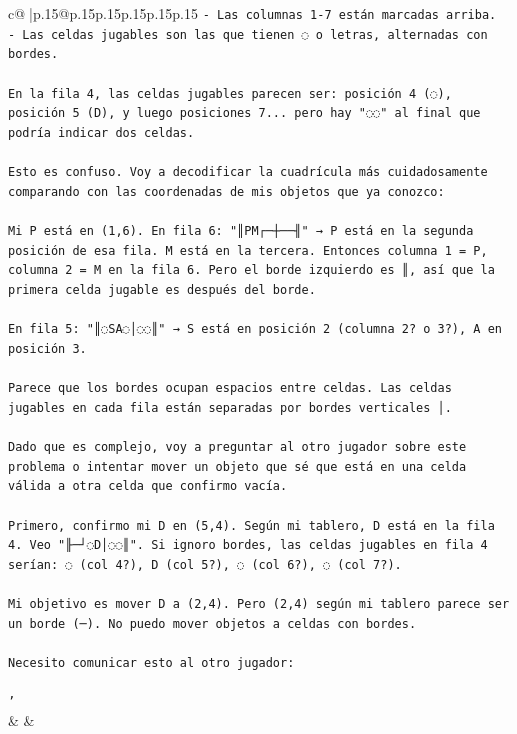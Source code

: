 \documentclass{article}
\begin{document}
{\begin{supertabular}{c@{$\;$}|p{.15\linewidth}@{}p{.15\linewidth}p{.15\linewidth}p{.15\linewidth}p{.15\linewidth}p{.15\linewidth}}
{{{\texttt{{-} Las columnas 1{-}7 están marcadas arriba.} \\
\texttt{{-} Las celdas jugables son las que tienen ◌ o letras, alternadas con bordes.} \\
\\ 
\texttt{En la fila 4, las celdas jugables parecen ser: posición 4 (◌), posición 5 (D), y luego posiciones 7... pero hay "◌◌" al final que podría indicar dos celdas.} \\
\\ 
\texttt{Esto es confuso. Voy a decodificar la cuadrícula más cuidadosamente comparando con las coordenadas de mis objetos que ya conozco:} \\
\\ 
\texttt{Mi P está en (1,6). En fila 6: "║PM┌─┼──╢" → P está en la segunda posición de esa fila. M está en la tercera. Entonces columna 1 = P, columna 2 = M en la fila 6. Pero el borde izquierdo es ║, así que la primera celda jugable es después del borde.} \\
\\ 
\texttt{En fila 5: "║◌SA◌│◌◌║" → S está en posición 2 (columna 2? o 3?), A en posición 3.} \\
\\ 
\texttt{Parece que los bordes ocupan espacios entre celdas. Las celdas jugables en cada fila están separadas por bordes verticales │.} \\
\\ 
\texttt{Dado que es complejo, voy a preguntar al otro jugador sobre este problema o intentar mover un objeto que sé que está en una celda válida a otra celda que confirmo vacía.} \\
\\ 
\texttt{Primero, confirmo mi D en (5,4). Según mi tablero, D está en la fila 4. Veo "╟─┘◌D│◌◌║". Si ignoro bordes, las celdas jugables en fila 4 serían: ◌ (col 4?), D (col 5?), ◌ (col 6?), ◌ (col 7?). } \\
\\ 
\texttt{Mi objetivo es mover D a (2,4). Pero (2,4) según mi tablero parece ser un borde (─). No puedo mover objetos a celdas con bordes.} \\
\\ 
\texttt{Necesito comunicar esto al otro jugador:} \\
\\ 
\texttt{'} \\
            }
        }
    }
    & & \\ \\


\end{supertabular}}
\end{document}
